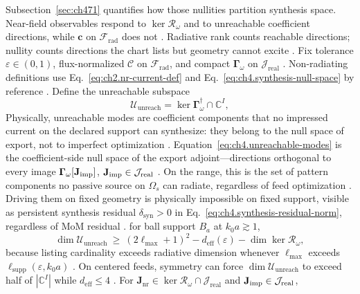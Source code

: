 Subsection~\ref{sec:ch471} quantifies how those nullities partition synthesis space. Near-field observables respond to $\ker\mathcal{R}_\omega$ and to unreachable coefficient directions, while $\mathbf{c}$ on $\mathcal{F}_{\mathrm{rad}}$ does not \cite{devaney2004}. Radiative rank counts reachable directions; nullity counts directions the chart lists but geometry cannot excite \cite{hansen1988}. Fix tolerance $\varepsilon\in(0,1)$, flux-normalized $\mathcal{C}$ on $\mathcal{F}_{\mathrm{rad}}$, and compact $\boldsymbol{\Gamma}_\omega$ on $\mathcal{J}_{\mathrm{real}}$ \cite{stratton1941}. Non-radiating definitions use Eq.~\eqref{eq:ch2.nr-current-def} and Eq.~\eqref{eq:ch4.synthesis-null-space} by reference \cite{harrington2001}.
Define the unreachable subspace
\begin{equation}
\label{eq:ch4.unreachable-modes}
\mathcal{U}_{\mathrm{unreach}}=\ker\boldsymbol{\Gamma}_\omega^{\dagger}\cap\mathbb{C}^{I},
\end{equation}
Physically, unreachable modes are coefficient components that no impressed current on the declared support can synthesize: they belong to the null space of export, not to imperfect optimization \cite{stratton1941}. Equation~\eqref{eq:ch4.unreachable-modes} is the coefficient-side null space of the export adjoint---directions orthogonal to every image $\boldsymbol{\Gamma}_\omega[\mathbf{J}_{\mathrm{imp}}]$, $\mathbf{J}_{\mathrm{imp}}\in\mathcal{J}_{\mathrm{real}}$ \cite{hansen1988}. On the range, this is the set of pattern components no passive source on $\Omega_{s}$ can radiate, regardless of feed optimization \cite{devaney2004}. Driving them on fixed geometry is physically impossible on fixed support, visible as persistent synthesis residual $\delta_{\mathrm{syn}}>0$ in Eq.~\eqref{eq:ch4.synthesis-residual-norm}, regardless of MoM residual \cite{harrington2001}.
for ball support \(B_{a}\) at \(k_{0}a\gtrsim1\),
\begin{equation}
\label{eq:ch4.unreach-dim-bound}
\dim\mathcal{U}_{\mathrm{unreach}}\ \ge\ (2\ell_{\max}+1)^{2}-d_{\mathrm{eff}}(\varepsilon)-\dim\ker\mathcal{R}_\omega,
\end{equation}
because listing cardinality exceeds radiative dimension whenever \(\ell_{\max}\) exceeds \(\ell_{\mathrm{supp}}(\varepsilon,k_{0}a)\)
\cite{hansen1988}. On centered feeds, symmetry can force \(\dim\mathcal{U}_{\mathrm{unreach}}\) to exceed half of
\(|\mathbb{C}^{I}|\) while \(d_{\mathrm{eff}}\le4\) \cite{jackson1999}.
\label{thm:ch4.nr-lift-invisibility}
For \(\mathbf{J}_{\mathrm{nr}}\in\ker\mathcal{R}_\omega\cap\mathcal{J}_{\mathrm{real}}\) and \(\mathbf{J}_{\mathrm{imp}}\in\mathcal{J}_{\mathrm{real}}\),
